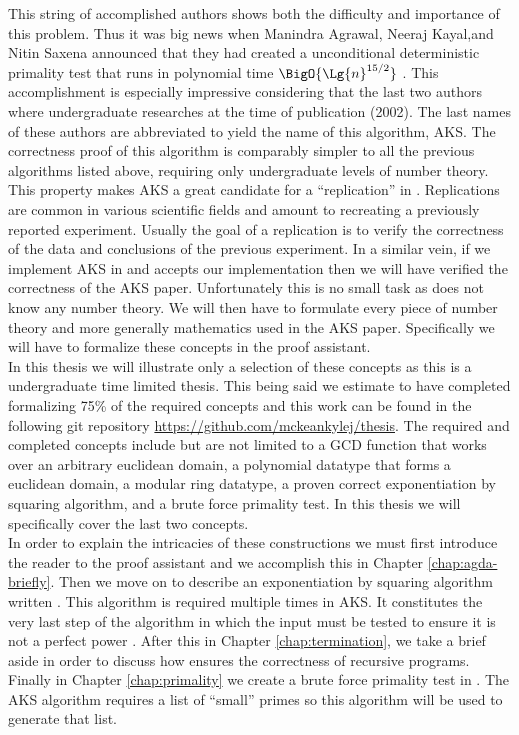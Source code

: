 \documentclass[./Thesis.tex]{subfiles}
\begin{document}
This string of accomplished authors shows both the difficulty and importance of this
problem. Thus it was big news when Manindra Agrawal, Neeraj Kayal,and Nitin
Saxena announced that they had created a unconditional deterministic
primality test that runs in polynomial time $\BigO{\Lg{n}^{15/2}}$ \cite{aks}.
This accomplishment is especially impressive considering that the last two
authors where undergraduate researches at the time of publication (2002). The
last names of these authors are abbreviated to yield the name of this algorithm,
AKS. The correctness proof of this algorithm is comparably simpler to all the
previous algorithms listed above, requiring only undergraduate levels of number
theory. This property makes AKS a great candidate for a ``replication'' in
\Agda{}. Replications are common in various scientific fields and amount to
recreating a previously reported experiment. Usually the goal of a replication
is to verify the correctness of the data and conclusions of the previous
experiment. In a similar vein, if we implement AKS in \Agda{} and \Agda{}
accepts our implementation then we will have verified the correctness of the AKS
paper. Unfortunately this is no small task as \Agda{} does not know any number theory.
We will then have to formulate every piece of number theory and more generally
mathematics used in the AKS paper. Specifically we will have to formalize these
concepts in the \Agda{} proof assistant. \\

In this thesis we will illustrate only
a selection of these concepts as this is a undergraduate time limited thesis.
This being said we estimate to have completed formalizing 75\% of the required
concepts and this work can be found in the following git repository
\url{https://github.com/mckeankylej/thesis}. The required and completed concepts
include but are not limited to a GCD function that works over an arbitrary
euclidean domain, a polynomial datatype that forms a euclidean domain,
a modular ring datatype, a proven correct exponentiation by squaring algorithm,
and a brute force primality test. In this thesis we will specifically cover the
last two concepts. \\

In order to explain the intricacies of these constructions we must first
introduce the reader to the \Agda{} proof assistant and we accomplish this in
Chapter \ref{chap:agda-briefly}. Then we move on to describe an exponentiation
by squaring algorithm written \Agda{}. This algorithm is required multiple times
in AKS. It constitutes the very last step of the algorithm in which the input
must be tested to ensure it is not a perfect power \cite{smid}. After this in
Chapter \ref{chap:termination}, we take a brief aside in order to discuss how
\Agda{} ensures the correctness of recursive programs. Finally in Chapter
\ref{chap:primality} we create a brute force primality test in \Agda{}. The AKS
algorithm requires a list of ``small'' primes so this algorithm will be used to
generate that list.
\end{document}
